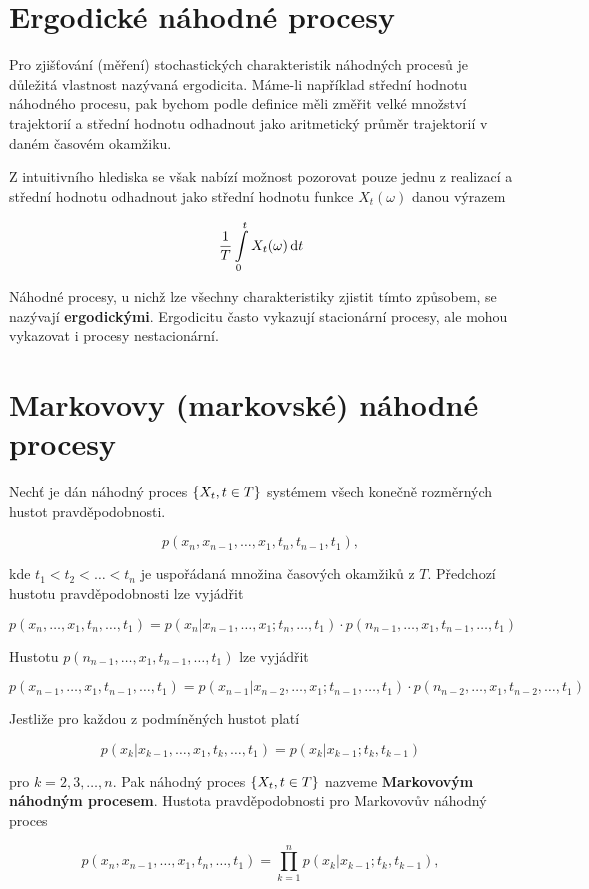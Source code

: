 \section{Ergodické náhodné procesy}
Pro zjišťování (měření) stochastických charakteristik náhodných procesů je důležitá vlastnost nazývaná ergodicita. Máme-li například střední hodnotu náhodného procesu, pak bychom podle definice měli změřit velké množství trajektorií a střední hodnotu odhadnout jako aritmetický průměr trajektorií v daném časovém okamžiku.\br

Z intuitivního hlediska se však nabízí možnost pozorovat pouze jednu z realizací a střední hodnotu odhadnout jako střední hodnotu funkce $X_t(\omega)$ danou výrazem

\[ \frac{1}{T}\int\limits_0^t X_t(\omega)\,\mathrm{d} t \]

Náhodné procesy, u nichž lze všechny charakteristiky zjistit tímto způsobem, se nazývají \textbf{ergodickými}. Ergodicitu často vykazují stacionární procesy, ale mohou vykazovat i procesy nestacionární.

\section{Markovovy (markovské) náhodné procesy}
Nechť je dán náhodný proces $\left\{X_t,t\in T\right\}$ systémem všech konečně rozměrných hustot pravděpodobnosti.

\[ p(x_n,x_{n-1},\ldots, x_1,t_n,t_{n-1},t_1), \]

kde $t_1<t_2<\ldots<t_n$ je uspořádaná množina časových okamžiků z $T$. Předchozí hustotu pravděpodobnosti lze vyjádřit

\[ p(x_n,\ldots,x_1,t_n,\ldots,t_1) = p(x_n|x_{n-1},\ldots,x_1;t_n,\ldots,t_1)\cdot p(n_{n-1},\ldots,x_1,t_{n-1},\ldots,t_1) \]

Hustotu $p(n_{n-1},\ldots,x_1,t_{n-1},\ldots,t_1)$ lze vyjádřit

\[ p(x_{n-1},\ldots,x_1,t_{n-1},\ldots,t_1) = p(x_{n-1}|x_{n-2},\ldots,x_1;t_{n-1},\ldots,t_1)\cdot p(n_{n-2},\ldots,x_1,t_{n-2},\ldots,t_1) \]

Jestliže pro každou z podmíněných hustot platí

\[ p(x_k|x_{k-1},\ldots,x_1,t_k,\ldots,t_1)=p(x_k|x_{k-1};t_k,t_{k-1}) \]

pro $k=2,3,\ldots,n$. Pak náhodný proces $\left\{X_t,t\in T\right\}$ nazveme \textbf{Markovovým náhodným procesem}. Hustota pravděpodobnosti pro Markovovův náhodný proces

\[ p(x_n,x_{n-1},\ldots,x_1,t_n,\ldots,t_1)=\prod_{k=1}^np(x_k|x_{k-1};t_k,t_{k-1}), \]

